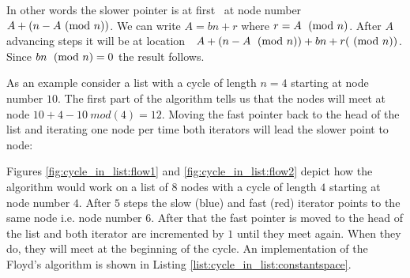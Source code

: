 In other words the slower pointer is at first  at node number \(A+(n-A \ (\mathrm{mod}\ n))\). We can write \( A = bn + r\) where \(r = A \;\ (\mathrm{mod}\ n)\). After \(A\) advancing steps it will be at location  \( A+(n-A \;\ (\mathrm{mod}\ n)) +bn +r (\ (\mathrm{mod}\ n))\). Since \(bn \; \ (\mathrm{mod}\ n)=0\) the result follows.

As an example consider a list with a cycle of length \(n=4\) starting at node number \(10\). The first part of the algorithm tells us that the nodes will meet at node \(10 + 4 - 10 \: mod(4) = 12\). Moving the fast pointer back to the head of the list and iterating one node per time both iterators will lead the slower point to node:



Figures \ref{fig:cycle_in_list:flow1} and \ref{fig:cycle_in_list:flow2} depict how the algorithm would work on a list of $8$ nodes with a cycle of length $4$ starting at node number $4$. After $5$ steps the slow (blue) and fast (red) iterator points to the same node i.e. node number $6$.
After that the fast pointer is moved to the head of the list and both iterator are incremented by $1$ until they meet again. When they do, they will meet at the beginning of the cycle.
An implementation of the Floyd's algorithm is shown in Listing \ref{list:cycle_in_list:constantspace}.



